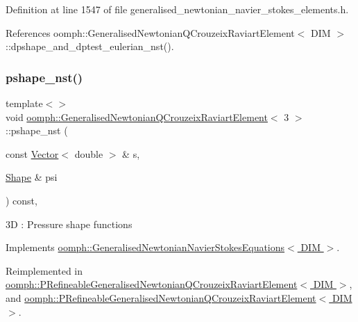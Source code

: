 Definition at line 1547 of file generalised\+\_\+newtonian\+\_\+navier\+\_\+stokes\+\_\+elements.\+h.



References oomph\+::\+Generalised\+Newtonian\+Q\+Crouzeix\+Raviart\+Element$<$ D\+I\+M $>$\+::dpshape\+\_\+and\+\_\+dptest\+\_\+eulerian\+\_\+nst().

\mbox{\label{classoomph_1_1GeneralisedNewtonianQCrouzeixRaviartElement_a976bf34e5d42bb8f2fd105818d59076c}} 
\subsubsection{\texorpdfstring{pshape\+\_\+nst()}{pshape\_nst()}\hspace{0.1cm}{\footnotesize\ttfamily [4/4]}}
{\footnotesize\ttfamily template$<$$>$ \\
void \hyperlink{classoomph_1_1GeneralisedNewtonianQCrouzeixRaviartElement}{oomph\+::\+Generalised\+Newtonian\+Q\+Crouzeix\+Raviart\+Element}$<$ 3 $>$\+::pshape\+\_\+nst (\begin{DoxyParamCaption}\item[{const \hyperlink{classoomph_1_1Vector}{Vector}$<$ double $>$ \&}]{s,  }\item[{\hyperlink{classoomph_1_1Shape}{Shape} \&}]{psi }\end{DoxyParamCaption}) const\hspace{0.3cm}{\ttfamily [inline]}, {\ttfamily [virtual]}}

3D \+: Pressure shape functions 

Implements \hyperlink{classoomph_1_1GeneralisedNewtonianNavierStokesEquations_a84735d21f3d1ade819726a71a7b462e1}{oomph\+::\+Generalised\+Newtonian\+Navier\+Stokes\+Equations$<$ D\+I\+M $>$}.



Reimplemented in \hyperlink{classoomph_1_1PRefineableGeneralisedNewtonianQCrouzeixRaviartElement_a80e3fffb08dc9228fae0535d15cbc096}{oomph\+::\+P\+Refineable\+Generalised\+Newtonian\+Q\+Crouzeix\+Raviart\+Element$<$ D\+I\+M $>$}, and \hyperlink{classoomph_1_1PRefineableGeneralisedNewtonianQCrouzeixRaviartElement_a663ff5b7e858c491d8d77649ca555781}{oomph\+::\+P\+Refineable\+Generalised\+Newtonian\+Q\+Crouzeix\+Raviart\+Element$<$ D\+I\+M $>$}.




